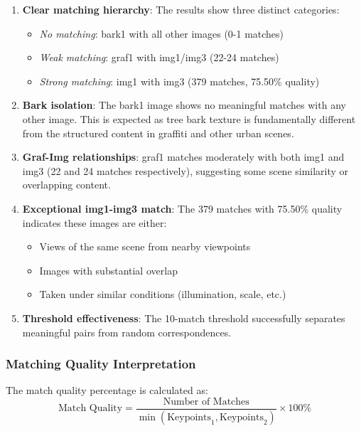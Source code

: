 \documentclass[12pt,a4paper]{article}
\begin{document}
\begin{enumerate}
    \item \textbf{Clear matching hierarchy}: The results show three distinct categories:
    \begin{itemize}
        \item \textit{No matching}: bark1 with all other images (0-1 matches)
        \item \textit{Weak matching}: graf1 with img1/img3 (22-24 matches)
        \item \textit{Strong matching}: img1 with img3 (379 matches, 75.50\% quality)
    \end{itemize}
    
    \item \textbf{Bark isolation}: The bark1 image shows no meaningful matches with any other image. This is expected as tree bark texture is fundamentally different from the structured content in graffiti and other urban scenes.
    
    \item \textbf{Graf-Img relationships}: graf1 matches moderately with both img1 and img3 (22 and 24 matches respectively), suggesting some scene similarity or overlapping content.
    
    \item \textbf{Exceptional img1-img3 match}: The 379 matches with 75.50\% quality indicates these images are either:
    \begin{itemize}
        \item Views of the same scene from nearby viewpoints
        \item Images with substantial overlap
        \item Taken under similar conditions (illumination, scale, etc.)
    \end{itemize}
    
    \item \textbf{Threshold effectiveness}: The 10-match threshold successfully separates meaningful pairs from random correspondences.
\end{enumerate}

\subsubsection{Matching Quality Interpretation}
The match quality percentage is calculated as:
\begin{equation}
\text{Match Quality} = \frac{\text{Number of Matches}}{\min(\text{Keypoints}_1, \text{Keypoints}_2)} \times 100\%
\end{equation}
\end{document}
